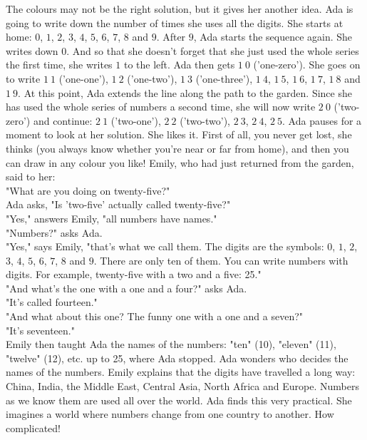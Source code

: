 The colours may not be the right solution, but it gives her another idea. Ada is going to write down the number of times she uses all the digits. She starts at home: $0$, $1$, $2$, $3$, $4$, $5$, $6$, $7$, $8$ and $9$. After $9$, Ada starts the sequence again. She writes down $0$. And so that she doesn't forget that she just used the whole series the first time, she writes $1$ to the left.
Ada then gets $1~0$ ('one-zero'). She goes on to write $1~1$ ('one-one'), $1~2$ ('one-two'), $1~3$ ('one-three'), $1~4$, $1~5$, $1~6$, $1~7$, $1~8$ and $1~9$. At this point, Ada extends the line along the path to the garden. Since she has used the whole series of numbers a second time, she will now write $2~0$ ('two-zero') and continue: $2~1$ ('two-one'), $2~2$ ('two-two'), $2~3$, $2~4$, $2~5$. Ada pauses for a moment to look at her solution. She likes it. First of all, you never get lost, she thinks (you always know whether you're near or far from home), and then you can draw in any colour you like! Emily, who had just returned from the garden, said to her:\\
"What are you doing on twenty-five?"\\
Ada asks, "Is 'two-five' actually called twenty-five?"\\
"Yes," answers Emily, "all numbers have names."\\ 
"Numbers?" asks Ada.\\
"Yes," says Emily, "that's what we call them. The digits are the symbols: $0$, $1$, $2$, $3$, $4$, $5$, $6$, $7$, $8$ and $9$. There are only ten of them. You can write numbers with digits. For example, twenty-five with a two and a five: 25."\\
"And what's the one with a one and a four?" asks Ada.\\
"It's called fourteen."\\
"And what about this one? The funny one with a one and a seven?"\\
"It's seventeen."\\
Emily then taught Ada the names of the numbers: "ten" (10), "eleven" (11), "twelve" (12), etc. up to 25, where Ada stopped. Ada wonders who decides the names of the numbers. Emily explains that the digits have travelled a long way: China, India, the Middle East, Central Asia, North Africa and Europe. Numbers as we know them are used all over the world. Ada finds this very practical. She imagines a world where numbers change from one country to another. How complicated!